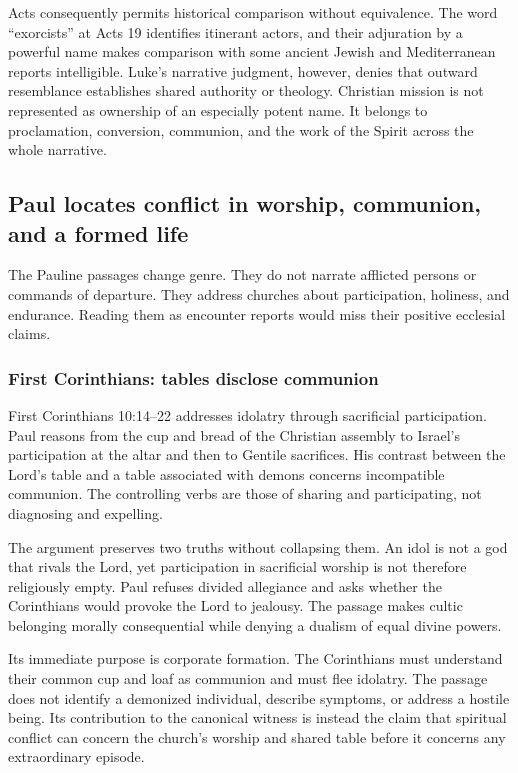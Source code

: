 Acts consequently permits historical comparison without equivalence.
The word ``exorcists'' at Acts 19 identifies itinerant actors, and their
adjuration by a powerful name makes comparison with some ancient Jewish and
Mediterranean reports intelligible. Luke's narrative judgment, however,
denies that outward resemblance establishes shared authority or theology.
Christian mission is not represented as ownership of an especially potent
name. It belongs to proclamation, conversion, communion, and the work of the
Spirit across the whole narrative.

\subsection{Paul locates conflict in worship, communion, and a formed life}

The Pauline passages change genre. They do not narrate afflicted persons or
commands of departure. They address churches about participation, holiness,
and endurance. Reading them as encounter reports would miss their positive
ecclesial claims.

\subsubsection{First Corinthians: tables disclose communion}

First Corinthians 10:14--22 addresses idolatry through sacrificial
participation. Paul reasons from the cup and bread of the Christian assembly
to Israel's participation at the altar and then to Gentile sacrifices.
His contrast between the Lord's table and a table associated with demons
concerns incompatible communion. The controlling verbs are those of sharing
and participating, not diagnosing and expelling.

The argument preserves two truths without collapsing them. An idol is not a
god that rivals the Lord, yet participation in sacrificial worship is not
therefore religiously empty. Paul refuses divided allegiance and asks whether
the Corinthians would provoke the Lord to jealousy. The passage makes cultic
belonging morally consequential while denying a dualism of equal divine
powers.

Its immediate purpose is corporate formation. The Corinthians must understand
their common cup and loaf as communion and must flee idolatry. The passage
does not identify a demonized individual, describe symptoms, or address a
hostile being. Its contribution to the canonical witness is instead the claim
that spiritual conflict can concern the church's worship and shared table
before it concerns any extraordinary episode.

